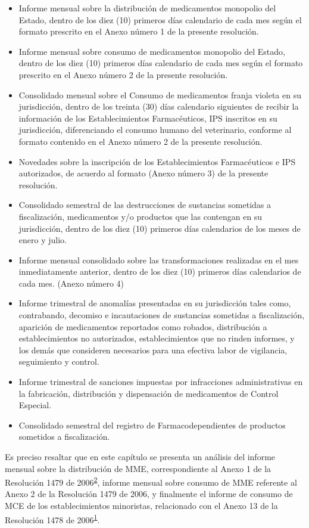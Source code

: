 \documentclass[
]{book}
\begin{document}
\begin{itemize}
\item
  Informe mensual sobre la distribución de medicamentos monopolio del Estado, dentro de los diez (10) primeros días calendario de cada mes según el formato prescrito en el Anexo número 1 de la presente resolución.
\item
  Informe mensual sobre consumo de medicamentos monopolio del Estado, dentro de los diez (10) primeros días calendario de cada mes según el formato prescrito en el Anexo número 2 de la presente resolución.
\item
  Consolidado mensual sobre el Consumo de medicamentos franja violeta en su jurisdicción, dentro de los treinta (30) días calendario siguientes de recibir la información de los Establecimientos Farmacéuticos, IPS inscritos en su jurisdicción, diferenciando el consumo humano del veterinario, conforme al formato contenido en el Anexo número 2 de la presente resolución.
\item
  Novedades sobre la inscripción de los Establecimientos Farmacéuticos e IPS autorizados, de acuerdo al formato (Anexo número 3) de la presente resolución.
\item
  Consolidado semestral de las destrucciones de sustancias sometidas a fiscalización, medicamentos y/o productos que las contengan en su jurisdicción, dentro de los diez (10) primeros días calendarios de los meses de enero y julio.
\item
  Informe mensual consolidado sobre las transformaciones realizadas en el mes inmediatamente anterior, dentro de los diez (10) primeros días calendarios de cada mes. (Anexo número 4)
\item
  Informe trimestral de anomalías presentadas en su jurisdicción tales como, contrabando, decomiso e incautaciones de sustancias sometidas a fiscalización, aparición de medicamentos reportados como robados, distribución a establecimientos no autorizados, establecimientos que no rinden informes, y los demás que consideren necesarios para una efectiva labor de vigilancia, seguimiento y control.
\item
  Informe trimestral de sanciones impuestas por infracciones administrativas en la fabricación, distribución y dispensación de medicamentos de Control Especial.
\item
  Consolidado semestral del registro de Farmacodependientes de productos sometidos a fiscalización.
\end{itemize}

Es preciso resaltar que en este capítulo se presenta un análisis del informe mensual sobre la distribución de MME, correspondiente al Anexo 1 de la Resolución 1479 de 2006\textsuperscript{\protect\hyperlink{ref-MSPS1479-2006}{2}}, informe mensual sobre consumo de MME referente al Anexo 2 de la Resolución 1479 de 2006, y finalmente el informe de consumo de MCE de los establecimientos minoristas, relacionado con el Anexo 13 de la Resolución 1478 de 2006\textsuperscript{\protect\hyperlink{ref-MSPS1478-2006}{1}}.
\end{document}
